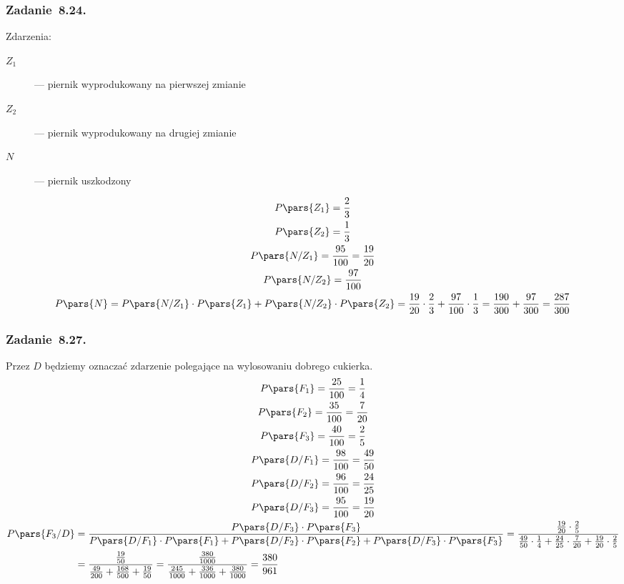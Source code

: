 \subsubsection*{Zadanie~8.24.}
Zdarzenia:
\begin{description}
    \item[\(Z_1\)] --- piernik wyprodukowany na pierwszej zmianie
    \item[\(Z_2\)] --- piernik wyprodukowany na drugiej zmianie
    \item[\(N\)] --- piernik uszkodzony
\end{description}
\begin{gather*}
    P\pars{Z_1} = \frac{2}{3}\\
    P\pars{Z_2} = \frac{1}{3}\\
    P\pars{N / Z_1} = \frac{95}{100} = \frac{19}{20}\\
    P\pars{N / Z_2} = \frac{97}{100}\\
    P\pars{N}
        = P\pars{N / Z_1} \cdot P\pars{Z_1} + P\pars{N / Z_2} \cdot P\pars{Z_2}
        = \frac{19}{20} \cdot \frac{2}{3} + \frac{97}{100} \cdot \frac{1}{3}
        = \frac{190}{300} + \frac{97}{300}
        = \frac{287}{300}
\end{gather*}
\subsubsection*{Zadanie~8.27.}
Przez \(D\) będziemy oznaczać zdarzenie polegające na wylosowaniu dobrego cukierka.
\begin{gather*}
    P\pars{F_1} = \frac{25}{100} = \frac{1}{4}\\
    P\pars{F_2} = \frac{35}{100} = \frac{7}{20}\\
    P\pars{F_3} = \frac{40}{100} = \frac{2}{5}\\
    P\pars{D / F_1} = \frac{98}{100} = \frac{49}{50}\\
    P\pars{D / F_2} = \frac{96}{100} = \frac{24}{25}\\
    P\pars{D / F_3} = \frac{95}{100} = \frac{19}{20}\\
    \begin{split}
    P\pars{F_3 / D}
        &= \frac{P\pars{D / F_3} \cdot P\pars{F_3}}{P\pars{D / F_1} \cdot P\pars{F_1} + P\pars{D / F_2} \cdot P\pars{F_2} + P\pars{D / F_3} \cdot P\pars{F_3}}
        = \frac{\frac{19}{20} \cdot \frac{2}{5}}{\frac{49}{50} \cdot \frac{1}{4} + \frac{24}{25} \cdot \frac{7}{20} + \frac{19}{20} \cdot \frac{2}{5}}\\
        &= \frac{\frac{19}{50}}{\frac{49}{200} + \frac{168}{500} + \frac{19}{50}}
        = \frac{\frac{380}{1000}}{\frac{245}{1000} + \frac{336}{1000} + \frac{380}{1000}}
        = \frac{380}{961}
    \end{split}
\end{gather*}
